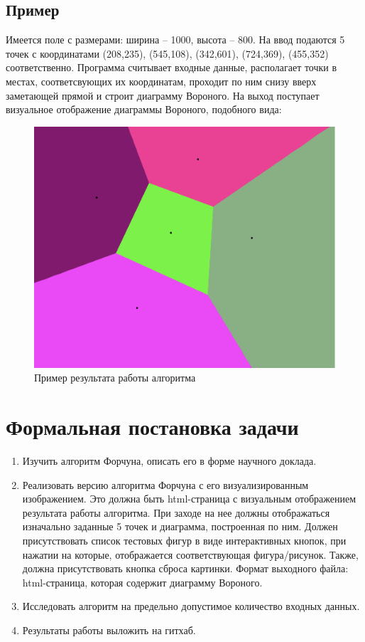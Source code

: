 \documentclass[ a4paper]{article}
\begin{document}
\clearpage

\subsection{Пример}
Имеется поле с размерами: ширина – 1000, высота – 800. 
На ввод подаются 5 точек с координатами (208,235), (545,108), (342,601), (724,369), (455,352) соответственно. Программа считывает входные данные, располагает точки в местах, соответсвующих их координатам, проходит по ним снизу вверх заметающей прямой и строит диаграмму Вороного. На выход поступает визуальное отображение диаграммы Вороного, подобного вида:\\
\begin{figure}[H]
\centering
\includegraphics[scale = 0.4]{Диаграмма для задачи}
\caption{\label{tab:widgets}Пример результата работы алгоритма}

\end{figure}

\clearpage
\section{Формальная постановка задачи}
\begin{enumerate}
\item Изучить алгоритм Форчуна, описать его в форме научного доклада.
\item Реализовать версию алгоритма Форчуна с его визуализированным изображением. Это должна быть html-страница с визуальным отображением результата работы алгоритма. При заходе на нее должны отображаться изначально заданные 5 точек и диаграмма, построенная по ним. Должен присутствовать список тестовых фигур в виде интерактивных кнопок, при нажатии на которые, отображается соответствующая фигура/рисунок. Также, должна присутствовать кнопка сброса картинки. 
		  Формат выходного файла: html-страница, которая содержит диаграмму Вороного.
\item Исследовать алгоритм на предельно допустимое количество входных данных.
\item Результаты работы выложить на гитхаб.
\end{enumerate}
\end{document}
